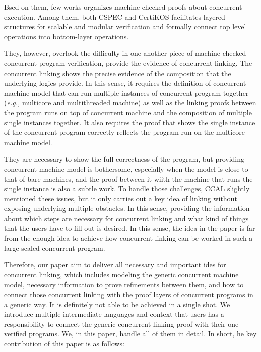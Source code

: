 Bsed on them, few works  
organizes machine checked proofs 
about concurrent execution. 
Among them, both CSPEC and CertiKOS facilitates layered structures 
for scalable and modular verification and formally connect top level operations into bottom-layer operations.

They, however, overlook the difficulty in one another piece of machine checked concurrent program verification, 
provide the evidence of concurrent linking.
The concurrent linking shows 
the precise evidence of the composition that the underlying logics provide. 
In this sense, 
it requires the definition of 
concurrent machine model that can run multiple instances of concurrent program together (\textit{e.g.,} multicore and multithreaded machine) 
as well as 
the linking proofs between the program runs on top of concurrent machine and the composition of multiple single instances together. 
It also requires the proof that 
shows the single instance of the concurrent program correctly reflects
the program run on the multicore machine model. 

They are necessary to show the full correctness of the program, 
but providing concurrent machine model is bothersome, especially when the model is close to that of bare machines, 
and the proof between it wiith the machine that runs the single instance is also a subtle work.
To handle those challenges,
CCAL slightly mentioned these issues,
but it only carries out
a key idea of
linking without exposing underlying multiple obstacles.  
In this sense, 
providing the information about which steps are necessary for concurrent linking and what kind of things that 
the users have to fill out is desired.
In this sense, the idea in the paper is far from 
the enough idea to achieve how 
concurrent linking can be worked in such 
a large scaled concurrent program. 




Therefore, our paper aim to deliver all necessary 
and important ides for concurrent linking,
which includes modeling the generic concurrent machine model, 
necessary information to prove refinements between them, 
and how to connect those concurrent linking with the 
proof layers of concurrent programs in a generic way. 
It is definitely not able to be achieved in a single shot.
We introduce multiple intermediate languages and 
context that users has a responsibility to 
connect the generic concurrent linking proof with 
their one verified programs.
We, in this paper, handle all of them in detail. 
In short, he key contribution of this paper is as follows: 

